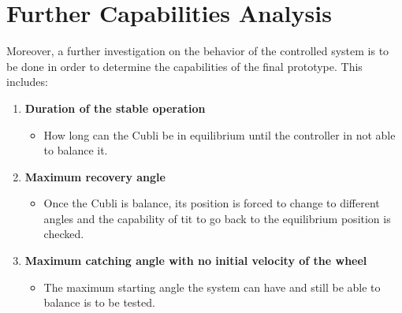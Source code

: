 \section{Further Capabilities Analysis}\label{title}
Moreover, a further investigation on the behavior of the controlled system is to be done in order to determine the capabilities of the final prototype. This includes:
\begin{enumerate}
\item \textbf{Duration of the stable operation}
	\begin{itemize}
	\item[] How long can the Cubli be in equilibrium until the controller in not able to balance it.
	\end{itemize}

	\item \textbf{Maximum recovery angle}
	\begin{itemize}
		\item[] Once the Cubli is balance, its position is forced to change to different angles and the capability of tit to go back to the equilibrium position is checked. 
	\end{itemize}
	
	\item \textbf{Maximum catching angle with no initial velocity of the wheel}
	\begin{itemize}
		\item[] The maximum starting angle the system can have and still be able to balance is to be tested.\\
	\end{itemize}
	
\end{enumerate}
